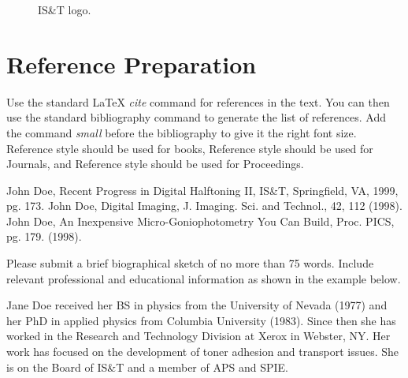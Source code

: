 \documentclass[letterpaper,twocolumn,fleqn]{article}
\begin{document}
\begin{figure}[!hb]
  \caption{IS\&T logo.}
  \label{Figure:logo}
\end{figure}


\section{Reference Preparation}
Use the standard LaTeX \emph{cite} command for references in the
text. You can then use the standard bibliography command to generate
the list of references. Add the command \emph{small} before the
bibliography to give it the right font size.  Reference \cite{bib1}
style should be used for books, Reference \cite{bib2} style should be
used for Journals, and Reference \cite{bib3} style should be used for
Proceedings.




\small
\begin{thebibliography}{9}
John Doe, Recent Progress in Digital Halftoning II,
  IS\&T, Springfield, VA, 1999, pg. 173.
John Doe, Digital Imaging, J. Imaging. Sci. and
  Technol., 42, 112 (1998).
John Doe, An Inexpensive Micro-Goniophotometry You Can
  Build, Proc. PICS, pg. 179. (1998).
\end{thebibliography}


\begin{biography}
Please submit a brief biographical sketch of no more than 75 words. 
Include relevant professional and educational information as shown 
in the example below.

Jane Doe received her BS in physics from the University of Nevada (1977) 
and her PhD in applied physics from Columbia University (1983). Since 
then she has worked in the Research and Technology Division at Xerox 
in Webster, NY. Her work has focused on the development of toner adhesion 
and transport issues. She is on the Board of  IS\&T and a member of APS 
and SPIE.
\end{biography}
\end{document}
